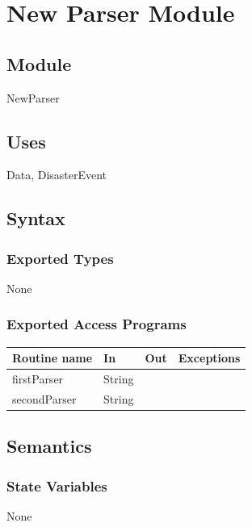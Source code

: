 \documentclass[12pt]{article}
\begin{document}
\newpage





\section {New Parser Module}

\subsection {Module}

NewParser

\subsection {Uses}

Data, DisasterEvent

\subsection {Syntax}

\subsubsection {Exported Types}

None

\subsubsection {Exported Access Programs}

\begin{tabular}{| l | l | l | l |}
\hline
\textbf{Routine name} & \textbf{In} & \textbf{Out} & \textbf{Exceptions}\\
\hline
firstParser & String & ~ & ~ \\
\hline
secondParser & String & ~ & ~ \\
\hline
\end{tabular}

\subsection {Semantics}

\subsubsection {State Variables}

None
\end{document}
